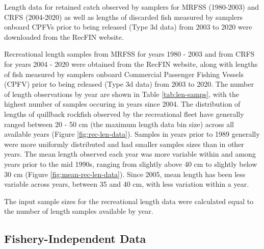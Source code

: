 \documentclass[11pt,
  english,
  a4paper,
]{article}
\begin{document}
\leavevmode\tagmcend\tagstructend


Length data for retained catch observed by samplers for MRFSS (1980-2003) and CRFS (2004-2020) as well as lengths of discarded fish measured by samplers onboard CPFVs prior to being released (Type 3d data) from 2003 to 2020 were downloaded from the RecFIN website.

\leavevmode\tagmcend\tagstructend\par


Recreational length samples from MRFSS for years 1980 - 2003 and from CRFS for years 2004 - 2020 were obtained from the RecFIN website, along with lengths of fish measured by samplers onboard Commercial Passenger Fishing Vessels (CPFV) prior to being released (Type 3d data) from 2003 to 2020. The number of length observations by year are shown in Table \ref{tab:len-samps}, with the highest number of samples occuring in years since 2004. The distribution of lengths of quillback rockfish observed by the recreational fleet have generally ranged between 20 - 50 cm (the maximum length data bin size) across all available years (Figure \ref{fig:rec-len-data}). Samples in years prior to 1989 generally were more uniformly distributed and had smaller samples sizes than in other years. The mean length observed each year was more variable within and among years prior to the mid 1990s, ranging from slightly above 40 cm to slightly below 30 cm (Figure \ref{fig:mean-rec-len-data}). Since 2005, mean length has been less variable across years, between 35 and 40 cm, with less variation within a year.

\leavevmode\tagmcend\tagstructend\par


The input sample sizes for the recreational length data were calculated equal to the number of length samples available by year.

\leavevmode\tagmcend\tagstructend\par


\hypertarget{fishery-independent-data}{%
\subsection{Fishery-Independent Data}\label{fishery-independent-data}}
\end{document}
